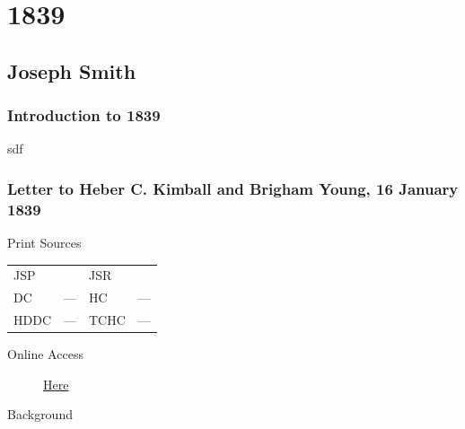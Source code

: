 \section{1839}

	\subsection{Joseph Smith}
		\label{EMS-1839-JS}

		\subsubsection{Introduction to 1839}
		
			sdf
			
		\subsubsection{Letter to Heber C. Kimball and Brigham Young, 16 January 1839}
			\label{EMS-1839-JS-16-JAN-1839}
			
			\begin{description}
				\item[Print Sources]
			\end{description}

			\begin{tabular}{p{0.5in}p{1in}p{0.5in}p{1in}}
				JSP	 	& 			& JSR 		&  \\
				DC	 	& ---		& HC 		& --- \\
				HDDC 	& ---		& TCHC 		& --- \\
			\end{tabular}
			
			\begin{description}
				\item[Online Access] \href{https://www.josephsmithpapers.org/paper-summary/letter-to-heber-c-kimball-and-brigham-young-16-january-1839/1}{Here}
			\end{description}
			
			\begin{description}
				\item[Background]
			\end{description}
			
